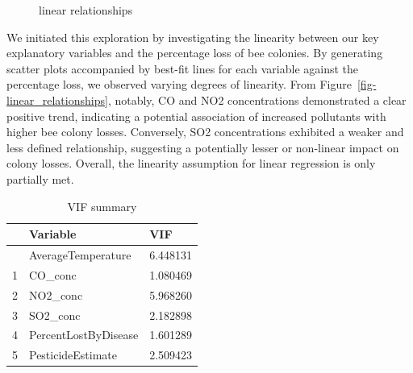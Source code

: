 \documentclass[
  letterpaper,
  DIV=11,
  numbers=noendperiod]{scrartcl}
\begin{document}
\begin{figure}
{{}




}

\caption{\label{fig-linear\_relationships}linear relationships}

\end{figure}%

We initiated this exploration by investigating the linearity between our
key explanatory variables and the percentage loss of bee colonies. By
generating scatter plots accompanied by best-fit lines for each variable
against the percentage loss, we observed varying degrees of linearity.
From Figure~\ref{fig-linear_relationships}, notably, CO and NO2
concentrations demonstrated a clear positive trend, indicating a
potential association of increased pollutants with higher bee colony
losses. Conversely, SO2 concentrations exhibited a weaker and less
defined relationship, suggesting a potentially lesser or non-linear
impact on colony losses. Overall, the linearity assumption for linear
regression is only partially met.

\begin{longtable}[]{@{}lll@{}}

\caption{\label{tbl-vif}VIF summary}

\tabularnewline

\toprule\noalign{}
& Variable & VIF \\
\midrule\noalign{}
\endhead
\bottomrule\noalign{}
\endlastfoot
0 & AverageTemperature & 6.448131 \\
1 & CO\_conc & 1.080469 \\
2 & NO2\_conc & 5.968260 \\
3 & SO2\_conc & 2.182898 \\
4 & PercentLostByDisease & 1.601289 \\
5 & PesticideEstimate & 2.509423 \\

\end{longtable}
\end{document}
